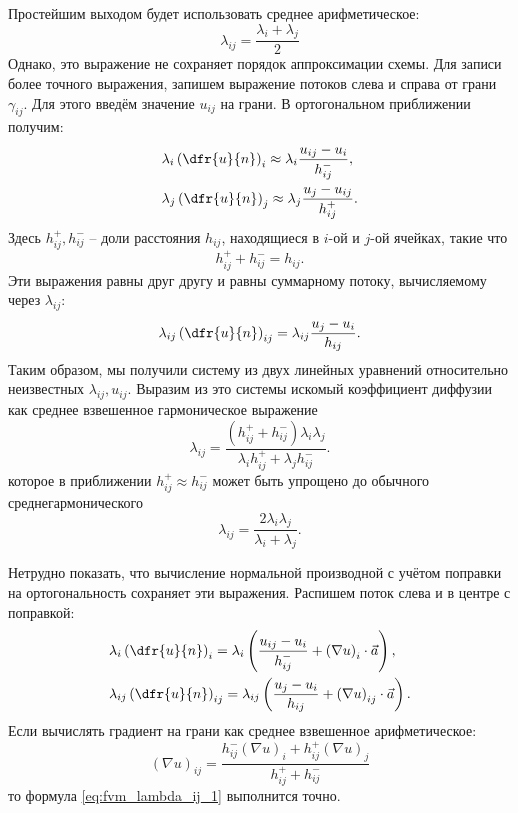 Простейшим выходом будет использовать среднее арифметическое:
\begin{equation}
\label{eq:fvm_lambda_ij_0}
\lambda_{ij} = \frac{\lambda_{i} + \lambda_{j}}{2}
\end{equation}
Однако, это выражение не сохраняет порядок аппроксимации схемы.
Для записи более точного выражения, запишем выражение потоков слева и справа от грани $\gamma_{ij}$.
Для этого введём значение $u_{ij}$ на грани. В ортогональном приближении получим:
\begin{align*}
&\lambda_i \left( \dfr{u}{n} \right)_i \approx \lambda_{i}\frac{u_{ij} - u_i}{h_{ij}^-} , \\
&\lambda_j \left( \dfr{u}{n} \right)_j \approx \lambda_{j}\frac{u_{j} - u_{ij}}{h_{ij}^+}.
\end{align*}
Здесь $h_{ij}^+, h_{ij}^-$ -- доли расстояния $h_{ij}$, находящиеся в $i$-ой и $j$-ой ячейках, такие что 
$$h_{ij}^+ + h_{ij}^- = h_{ij}.$$
Эти выражения равны друг другу и равны суммарному потоку, вычисляемому через $\lambda_{ij}$:
\begin{equation}
\label{eq:fvm_dudn_lambda}
\lambda_{ij} \left(\dfr{u}{n}\right)_{ij} = \lambda_{ij} \frac{u_j - u_i}{h_{ij}}.
\end{equation}
Таким образом, мы получили систему из двух линейных уравнений
относительно неизвестных $\lambda_{ij}, u_{ij}$.
Выразим из это системы искомый коэффициент диффузии как среднее взвешенное гармоническое выражение
\begin{equation}
\label{eq:fvm_lambda_ij_1}
\lambda_{ij} = \frac{(h^+_{ij} + h^-_{ij}) \lambda_i \lambda_j}{\lambda_i h^+_{ij} + \lambda_j h^-_{ij}}.
\end{equation}
которое в приближении $h^+_{ij} \approx h^-_{ij}$ может быть упрощено до обычного среднегармонического
\begin{equation}
\label{eq:fvm_lambda_ij_2}
\lambda_{ij} = \frac{2\lambda_i\lambda_j}{\lambda_i + \lambda_j}.
\end{equation}

Нетрудно показать, что вычисление нормальной производной с учётом поправки на ортогональность
сохраняет эти выражения. Распишем поток слева и в центре с поправкой:
\begin{align*}
&\lambda_i \left( \dfr{u}{n} \right)_i = \lambda_{i}\left(\frac{u_{ij} - u_i}{h_{ij}^-} + \left(\nabla u\right)_i \cdot \vec a\right), \\
&\lambda_{ij} \left(\dfr{u}{n}\right)_{ij} = \lambda_{ij} \left(\frac{u_j - u_i}{h_{ij}} + \left(\nabla u\right)_{ij} \cdot \vec a\right).
\end{align*}
Если вычислять градиент на грани
как среднее взвешенное арифметическое:
\begin{equation*}
\left(\nabla u\right)_{ij} = \frac{h^-_{ij} \left(\nabla u\right)_i + h^+_{ij} \left(\nabla u\right)_j}{h^+_{ij} + h^-_{ij}}
\end{equation*}
то формула \cref{eq:fvm_lambda_ij_1} выполнится точно.


